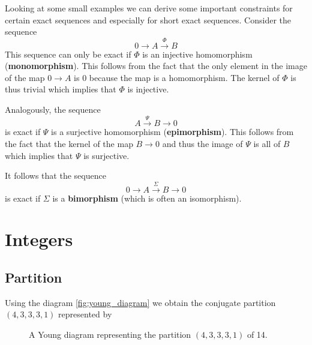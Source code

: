 	\begin{property}
		Looking at some small examples we can derive some important constraints for certain exact sequences and especially for short exact sequences. Consider the sequence
		\[
			0\rightarrow A\xrightarrow{\Phi} B
		\]
		This sequence can only be exact if $\Phi$ is an injective homomorphism (\textbf{monomorphism}). This follows from the fact that the only element in the image of the map $0\rightarrow A$ is 0 because the map is a homomorphism. The kernel of $\Phi$ is thus trivial which implies that $\Phi$ is injective.
		
		Analogously, the sequence
		\[
			A\xrightarrow{\Psi}B\rightarrow0
		\]
		is exact if $\Psi$ is a surjective homomorphism (\textbf{epimorphism}). This follows from the fact that the kernel of the map $B\rightarrow0$ and thus the image of $\Psi$ is all of $B$ which implies that $\Psi$ is surjective.
		
		It follows that the sequence
		\[
			0\rightarrow A\xrightarrow{\Sigma}B\rightarrow0
		\]
		is exact if $\Sigma$ is a \textbf{bimorphism} (which is often an isomorphism).
	\end{property}

\section{Integers}
\subsection{Partition}
	
	\begin{example}
		Using the diagram \ref{fig:young_diagram} we obtain the conjugate partition $(4, 3, 3, 3, 1)$ represented by
		\begin{figure}[!ht]
			\centering
			\caption{A Young diagram representing the partition $(4, 3, 3, 3, 1)$ of 14.}
			\label{fig:young_diagram_conj}
		\end{figure}
	\end{example}
	
